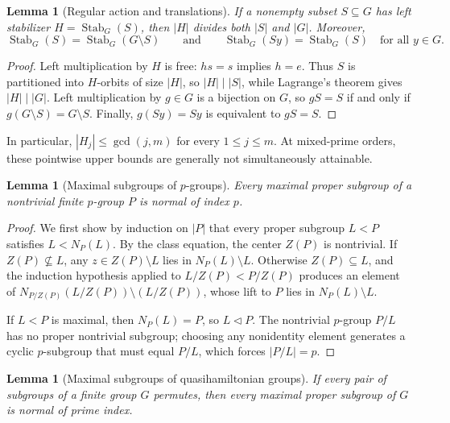 \documentclass[11pt,reqno]{amsart}
\numberwithin{equation}{section}
\newtheorem{lemma}[theorem]{Lemma}
\theoremstyle{definition}
\theoremstyle{remark}
\newcommand{\Stab}{\operatorname{Stab}}
\begin{document}
\begin{lemma}[Regular action and translations]
\label{lem:reg}
If a nonempty subset $S\subseteq G$ has left stabilizer $H=\Stab_G(S)$, then $|H|$ divides both $|S|$ and $|G|$. Moreover,
\[
\Stab_G(S) = \Stab_G(G\setminus S)
\qquad\text{and}\qquad
\Stab_G(Sy) = \Stab_G(S) \quad\text{for all } y\in G.
\]
\end{lemma}

\begin{proof}
Left multiplication by $H$ is free: $hs=s$ implies $h=e$. Thus $S$ is partitioned into $H$-orbits of size $|H|$, so $|H|\mid |S|$, while Lagrange's theorem gives $|H|\mid |G|$. Left multiplication by $g\in G$ is a bijection on $G$, so $gS=S$ if and only if $g(G\setminus S)=G\setminus S$. Finally, $g(Sy)=Sy$ is equivalent to $gS=S$.
\end{proof}

In particular, $|H_j|\le \gcd(j,m)$ for every $1\le j\le m$. At mixed-prime orders, these pointwise upper bounds are generally not simultaneously attainable.

\begin{lemma}[Maximal subgroups of $p$-groups]
\label{lem:pmax}
Every maximal proper subgroup of a nontrivial finite $p$-group $P$ is normal of index $p$.
\end{lemma}

\begin{proof}
We first show by induction on $|P|$ that every proper subgroup $L<P$ satisfies $L < N_P(L)$. By the class equation, the center $Z(P)$ is nontrivial. If $Z(P)\not\subseteq L$, any $z\in Z(P)\setminus L$ lies in $N_P(L)\setminus L$. Otherwise $Z(P)\subseteq L$, and the induction hypothesis applied to $L/Z(P) < P/Z(P)$ produces an element of $N_{P/Z(P)}(L/Z(P))\setminus (L/Z(P))$, whose lift to $P$ lies in $N_P(L)\setminus L$.

If $L<P$ is maximal, then $N_P(L)=P$, so $L\lhd P$. The nontrivial $p$-group $P/L$ has no proper nontrivial subgroup; choosing any nonidentity element generates a cyclic $p$-subgroup that must equal $P/L$, which forces $|P/L|=p$.
\end{proof}

\begin{lemma}[Maximal subgroups of quasihamiltonian groups]
\label{lem:qmax}
If every pair of subgroups of a finite group $G$ permutes, then every maximal proper subgroup of $G$ is normal of prime index.
\end{lemma}
\end{document}
